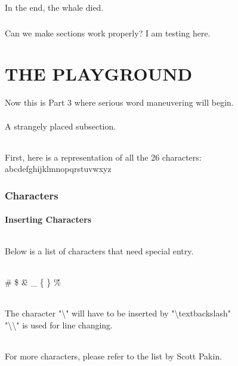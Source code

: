 \documentclass{article}\usepackage[]{graphicx}\usepackage[]{color}
\begin{document}
\part{}
In the end, the whale died.

\section{}
Can we make sections work properly? I am testing here.

\part{THE PLAYGROUND}
Now this is Part 3 where serious word maneuvering will begin.

\subsection{}
A strangely placed subsection.

\paragraph{}
First, here is a representation of all the 26 characters: abcdefghijklmnopqrstuvwxyz

\section{Characters}

\subsection{Inserting Characters}

\paragraph{}
Below is a list of characters that need special entry.

\paragraph{}
\# \$ \^  \& \_ \{ \} \~ \%

\paragraph{}
The character "\textbackslash" will  have to be inserted by "\textbackslash textbackslash"
\\
"\textbackslash\textbackslash" is used for line changing.

\paragraph{}
For more characters, please refer to the list by Scott Pakin.

\paragraph{}
\end{document}
